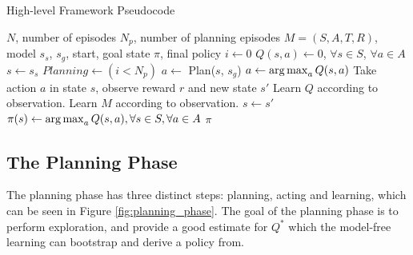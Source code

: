 \begin{algorithm}
\caption{High-level Framework Pseudocode}
\label{alg:framework_pc}
\begin{algorithmic}
\REQUIRE $N$, number of episodes
\REQUIRE $N_p$, number of planning episodes
\REQUIRE $M=(S,A,T,R)$, model
\REQUIRE $s_s$, $s_g$, start, goal state
\ENSURE $\pi$, final policy
\STATE $i \leftarrow 0$
\STATE $Q(s,a) \leftarrow 0 $, $\forall s \in S$, $\forall a \in A$
\STATE $s \leftarrow s_s$
    \STATE $Planning \leftarrow (i < N_p)$
            \STATE $a \leftarrow$ Plan($s$, $s_g$)
        \ELSE
            \STATE $a \leftarrow \operatorname*{arg\,max}_a Q(s,a)$
        \ENDIF
        \STATE Take action $a$ in state $s$, observe reward $r$ and new state $s'$
        \STATE Learn $Q$ according to observation.
            \STATE Learn $M$ according to observation.
        \ENDIF
        $s \leftarrow s'$
    \ENDWHILE
\ENDFOR
\STATE $\pi(s) \leftarrow \operatorname*{arg\,max}_a Q(s,a), \forall s \in S, \forall a \in A$
\RETURN $\pi$
\end{algorithmic}
\end{algorithm}


\subsection{The Planning Phase}
The planning phase has three distinct steps: planning, acting and learning, which can be seen in Figure \ref{fig:planning_phase}. The goal of the planning phase is to perform exploration, and provide a good estimate for $Q^*$ which the model-free learning can bootstrap and derive a policy from.

